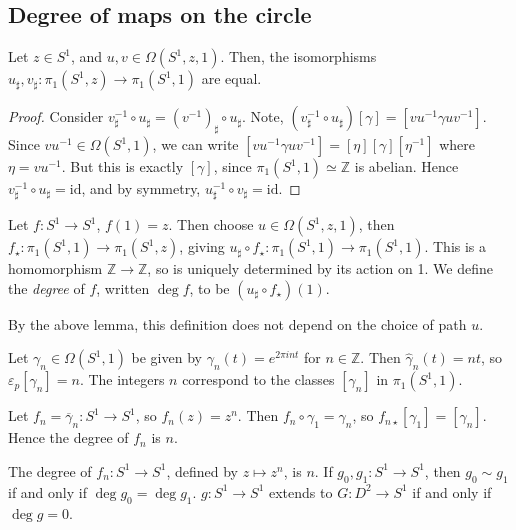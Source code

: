 \subsection{Degree of maps on the circle}
\begin{lemma}
	Let \( z \in S^1 \), and \( u, v \in \Omega(S^1, z, 1) \).
	Then, the isomorphisms \( u_\sharp, v_\sharp \colon \pi_1(S^1, z) \to \pi_1(S^1, 1) \) are equal.
\end{lemma}
\begin{proof}
	Consider \( v_\sharp^{-1} \circ u_\sharp = (v^{-1})_\sharp \circ u_\sharp \).
	Note, \( (v_\sharp^{-1} \circ u_\sharp)[\gamma] = [vu^{-1}\gamma uv^{-1}] \).
	Since \( vu^{-1} \in \Omega(S^1, 1) \), we can write \( [vu^{-1}\gamma uv^{-1}] = [\eta][\gamma][\eta^{-1}] \) where \( \eta = vu^{-1} \).
	But this is exactly \( [\gamma] \), since \( \pi_1(S^1,1) \simeq \mathbb Z \) is abelian.
	Hence \( v_\sharp^{-1} \circ u_\sharp = \mathrm{id} \), and by symmetry, \( u_\sharp^{-1} \circ v_\sharp = \mathrm{id} \).
\end{proof}
\begin{definition}
	Let \( f \colon S^1 \to S^1 \), \( f(1) = z \).
	Then choose \( u \in \Omega(S^1, z, 1) \), then \( f_\star \colon \pi_1(S^1,1) \to \pi_1(S^1,z) \), giving \( u_\sharp \circ f_\star \colon \pi_1(S^1, 1) \to \pi_1(S^1, 1) \).
	This is a homomorphism \( \mathbb Z \to \mathbb Z \), so is uniquely determined by its action on 1.
	We define the \emph{degree} of \( f \), written \( \deg f \), to be \( (u_\sharp \circ f_\star)(1) \).
\end{definition}
By the above lemma, this definition does not depend on the choice of path \( u \).
\begin{example}
	Let \( \gamma_n \in \Omega(S^1,1) \) be given by \( \gamma_n(t) = e^{2\pi i n t} \) for \( n \in \mathbb Z \).
	Then \( \hat \gamma_n(t) = n t \), so \( \varepsilon_p[\gamma_n] = n \).
	The integers \( n \) correspond to the classes \( [\gamma_n] \) in \( \pi_1(S^1,1) \).

	Let \( f_n = \overline \gamma_n \colon S^1 \to S^1 \), so \( f_n(z) = z^n \).
	Then \( f_n \circ \gamma_1 = \gamma_n \), so \( f_{n\star}[\gamma_1] = [\gamma_n] \).
	Hence the degree of \( f_n \) is \( n \).
\end{example}
\begin{proposition}
	The degree of \( f_n : S^1 \to S^1 \), defined by \( z \mapsto z^n \), is \( n \).
	If \( g_0, g_1 \colon S^1 \to S^1 \), then \( g_0 \sim g_1 \) if and only if \( \deg g_0 = \deg g_1 \).
	\( g \colon S^1 \to S^1 \) extends to \( G \colon D^2 \to S^1 \) if and only if \( \deg g = 0 \).
\end{proposition}
